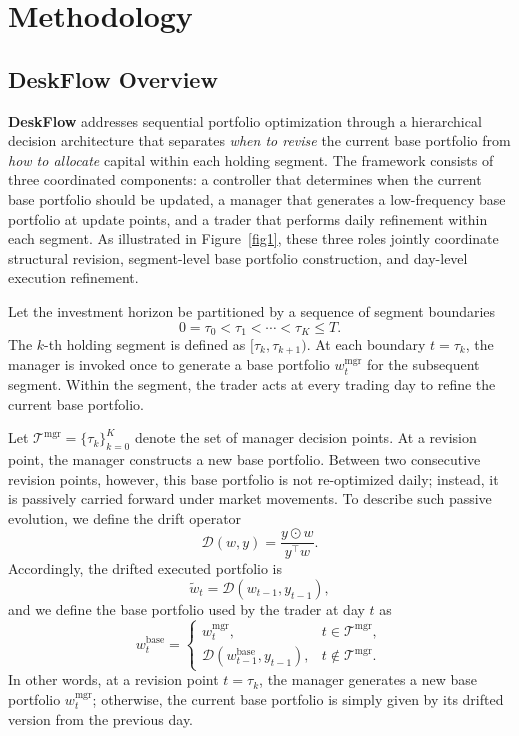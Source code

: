 \documentclass[letterpaper]{article} %
\begin{document}
\section{Methodology}
\subsection{\textbf{DeskFlow} Overview}

\textbf{DeskFlow} addresses sequential portfolio optimization through a hierarchical decision architecture that separates \emph{when to revise} the current base portfolio from \emph{how to allocate} capital within each holding segment. The framework consists of three coordinated components: a controller that determines when the current base portfolio should be updated, a manager that generates a low-frequency base portfolio at update points, and a trader that performs daily refinement within each segment. As illustrated in Figure~\ref{fig1}, these three roles jointly coordinate structural revision, segment-level base portfolio construction, and day-level execution refinement.

Let the investment horizon be partitioned by a sequence of segment boundaries
\[
0=\tau_0<\tau_1<\cdots<\tau_K\le T.
\]
The \(k\)-th holding segment is defined as \([\tau_k,\tau_{k+1})\). At each boundary \(t=\tau_k\), the manager is invoked once to generate a base portfolio \(w_t^{\mathrm{mgr}}\) for the subsequent segment. Within the segment, the trader acts at every trading day to refine the current base portfolio.

Let \(\mathcal{T}^{\mathrm{mgr}}=\{\tau_k\}_{k=0}^{K}\) denote the set of manager decision points. At a revision point, the manager constructs a new base portfolio. Between two consecutive revision points, however, this base portfolio is not re-optimized daily; instead, it is passively carried forward under market movements. To describe such passive evolution, we define the drift operator
\[
\mathcal{D}(w,y)=\frac{y\odot w}{y^\top w}.
\]
Accordingly, the drifted executed portfolio is
\[
\tilde w_t=\mathcal{D}(w_{t-1},y_{t-1}),
\]
and we define the base portfolio used by the trader at day \(t\) as
\[
w_t^{\mathrm{base}}=
\begin{cases}
w_t^{\mathrm{mgr}}, & t\in\mathcal{T}^{\mathrm{mgr}},\\[4pt]
\mathcal{D}(w_{t-1}^{\mathrm{base}},y_{t-1}), & t\notin\mathcal{T}^{\mathrm{mgr}}.
\end{cases}
\]
In other words, at a revision point \(t=\tau_k\), the manager generates a new base portfolio \(w_t^{\mathrm{mgr}}\); otherwise, the current base portfolio is simply given by its drifted version from the previous day.
\end{document}
